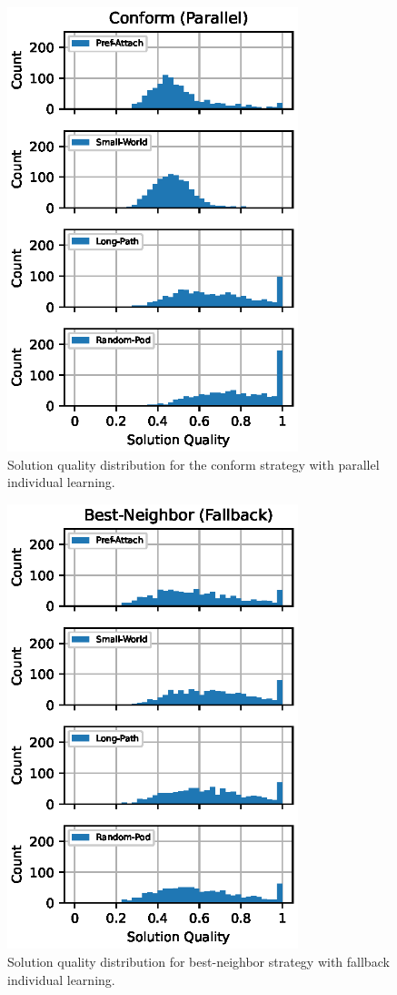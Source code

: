 \begin{figure}
    \centering
    \includegraphics[width=3.33in]{chapters/figures/NetDelibABM/results-conf-parallel-dist.eps}
	\caption{Solution quality distribution for the conform strategy with parallel individual learning.}
    \label{fig:results-conf-parallel-dist}
\end{figure}

\begin{figure}
    \centering
    \includegraphics[width=3.33in]{chapters/figures/NetDelibABM/results-bn-fallback-dist.eps}
	\caption{Solution quality distribution for best-neighbor strategy with fallback individual learning.}
    \label{fig:results-bn-fallback-dist}
\end{figure}

